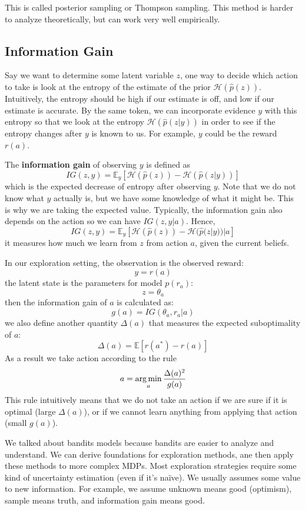 This is called posterior sampling or Thompson sampling. This method is harder to analyze theoretically, but can work very well empirically.
\subsection{Information Gain}
Say we want to determine some latent variable $z$, one way to decide which action to take is look at the entropy of the estimate of the prior $\mathcal{H}(\hat{p}(z))$. Intuitively, the entropy should be high if our estimate is off, and low if our estimate is accurate. By the same token, we can incorporate evidence $y$ with this entropy so that we look at the entropy $\mathcal{H}(\hat{p}(z|y))$ in order to see if the entropy changes after $y$ is known to us. For example, $y$ could be the reward $r(a)$. 

The \textbf{information gain} of observing $y$ is defined as
\[
IG(z,y) = \mathbb{E}_y[\mathcal{H}(\hat{p}(z)) - \mathcal{H}(\hat{p}(z|y))]
\]
which is the expected decrease of entropy after observing $y$. Note that we do not know what $y$ actually is, but we have some knowledge of what it might be. This is why we are taking the expected value. Typically, the information gain also depends on the action so we can have $IG(z,y|a)$. Hence,
\[
IG(z,y) = \mathbb{E}_y[\mathcal{H}(\hat{p}(z)) - \mathcal{H}(\hat{p}(z|y))|a]
\]
it measures how much we learn from $z$ from action $a$, given the current beliefs.

In our exploration setting, the observation is the observed reward:
\[
y = r(a)
\]
the latent state is the parameters for model $p(r_a)$:
\[
z = \theta_a
\]
then the information gain of $a$ is calculated as:
\[
g(a) = IG(\theta_a,r_a|a)
\]
we also define another quantity $\Delta(a)$ that measures the expected suboptimality of $a$:
\[
\Delta(a) = \mathbb{E}[r(a^*) - r(a)]
\]
As a result we take action according to the rule
\[
a = \operatorname*{arg\,min}_a\frac{\Delta(a)^2}{g(a)}
\]
This rule intuitively means that we do not take an action if we are sure if it is optimal (large $\Delta(a)$), or if we cannot learn anything from applying that action (small $g(a)$).

We talked about bandits models because bandits are easier to analyze and understand. We can derive foundations for exploration methods, ane then apply these methods to more complex MDPs. Most exploration strategies require some kind of uncertainty estimation (even if it’s naïve). We usually assumes some value to new information. For example, we assume unknown means good (optimism), sample means truth, and information gain means good.

